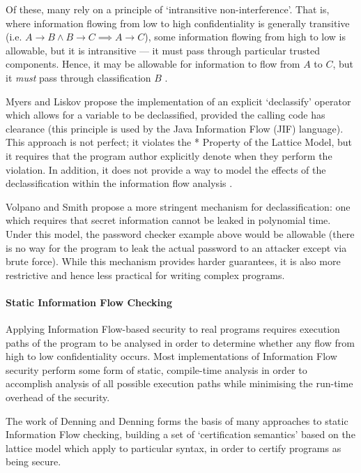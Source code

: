 	Of these, many rely on a principle of `intransitive non-interference'. That is, where information flowing from low to high confidentiality is generally transitive (i.e. $ A \rightarrow B \wedge B \rightarrow C \implies A \rightarrow C $), some information flowing from high to low is allowable, but it is intransitive --- it must pass through particular trusted components. Hence, it may be allowable for information to flow from $ A $ to $ C $, but it \textit{must} pass through classification $ B $ \cite{roscoe1999intransitive}.
	
	Myers and Liskov \cite{myers1997if} propose the implementation of an explicit `declassify' operator which allows for a variable to be declassified, provided the calling code has clearance (this principle is used by the Java Information Flow (JIF) language). This approach is not perfect; it violates the * Property of the Lattice Model, but it requires that the program author explicitly denote when they perform the violation. In addition, it does not provide a way to model the effects of the declassification within the information flow analysis  \cite{zdancewic2004challenges}.
	
	Volpano and Smith \cite{volpano2000declassification} propose a more stringent mechanism for declassification: one which requires that secret information cannot be leaked in polynomial time. Under this model, the password checker example above would be allowable (there is no way for the program to leak the actual password to an attacker except via brute force). While this mechanism provides harder guarantees, it is also more restrictive \cite{zdancewic2004challenges} and hence less practical for writing complex programs.
	
	\paragraph{Static Information Flow Checking}
	
	Applying Information Flow-based security to real programs requires execution paths of the program to be analysed in order to determine whether any flow from high to low confidentiality occurs. Most implementations of Information Flow security perform some form of static, compile-time analysis in order to accomplish analysis of all possible execution paths while minimising the run-time overhead of the security.
	
	The work of Denning and Denning \cite{denning1977if} forms the basis of many approaches to static Information Flow checking, building a set of `certification semantics' based on the lattice model which apply to particular syntax, in order to certify programs as being secure.
	
